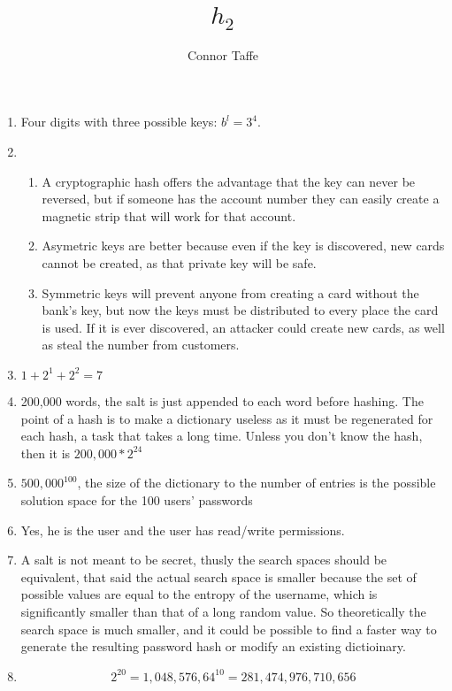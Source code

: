 \documentclass{article}
\title{$h_{2}$}
\author{Connor Taffe}
\begin{document}
  \maketitle

  \begin{enumerate}
    \item {
      Four digits with three possible keys: $b^l = 3^4$.
    }
    \item {
      \begin{enumerate}
        \item A cryptographic hash offers the advantage that the key can never be reversed, but if someone has the account number they can easily create a magnetic strip that will work for that account.
        \item Asymetric keys are better because even if the key is discovered, new cards cannot be created, as that private key will be safe.
        \item Symmetric keys will prevent anyone from creating a card without the bank's key, but now the keys must be distributed to every place the card is used. If it is ever discovered, an attacker could create new cards, as well as steal the number from customers.
      \end{enumerate}
    }
    \item $1+2^1+2^2 = 7$
    \item 200,000 words, the salt is just appended to each word before hashing. The point of a hash is to make a dictionary useless as it must be regenerated for each hash, a task that takes a long time. Unless you don't know the hash, then it is $200,000*2^{24}$
    \item $500,000^{100}$, the size of the dictionary to the number of entries is the possible solution space for the 100 users' passwords
    \item Yes, he is the user and the user has read/write permissions.
    \item A salt is not meant to be secret, thusly the search spaces should be equivalent, that said the actual search space is smaller because the set of possible values are equal to the entropy of the username, which is significantly smaller than that of a long random value. So theoretically the search space is much smaller, and it could be possible to find a faster way to generate the resulting password hash or modify an existing dictioinary.
    \item {
      \begin{equation}
        2^{20} = 1,048,576, 64^{10} = 281,474,976,710,656
      \end{equation}

}
\end{enumerate}
\end{document}
